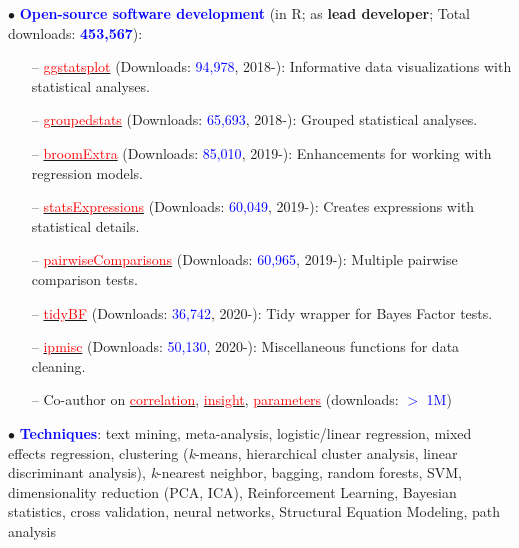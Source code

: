 \documentclass[10pt]{article}
\begin{document}
	$\bullet$ \textcolor{blue}{\textbf{Open-source software development}} (in R; as \textbf{lead developer}; Total downloads: \textcolor{blue}{\textbf{453,567}}):
	 \vspace*{-0.09in}
	 
	\begin{itemize}
	\itemsep-0.1em
	\item[--] \href{https://indrajeetpatil.github.io/ggstatsplot/}{\textcolor{red}{ggstatsplot}} (Downloads: \textcolor{blue}{94,978}, 2018-): Informative data visualizations with statistical analyses.
	\item[--] \href{https://indrajeetpatil.github.io/groupedstats/}{\textcolor{red}{groupedstats}} (Downloads: \textcolor{blue}{65,693}, 2018-): Grouped statistical analyses.
	\item[--] \href{https://indrajeetpatil.github.io/groupedstats/}{\textcolor{red}{broomExtra}} (Downloads: \textcolor{blue}{85,010}, 2019-): Enhancements for working with regression models.
	\item[--] \href{https://indrajeetpatil.github.io/statsExpressions/}{\textcolor{red}{statsExpressions}} (Downloads: \textcolor{blue}{60,049}, 2019-): Creates expressions with statistical details.
	\item[--] \href{https://indrajeetpatil.github.io/pairwiseComparisons/}{\textcolor{red}{pairwiseComparisons}} (Downloads: \textcolor{blue}{60,965}, 2019-): Multiple pairwise comparison tests.
    \item[--] \href{https://indrajeetpatil.github.io/tidyBF/}{\textcolor{red}{tidyBF}} (Downloads: \textcolor{blue}{36,742}, 2020-): Tidy wrapper for Bayes Factor tests.
	\item[--] \href{https://indrajeetpatil.github.io/ipmisc/}{\textcolor{red}{ipmisc}} (Downloads: \textcolor{blue}{50,130}, 2020-): Miscellaneous functions for data cleaning.	
	\item[--] Co-author on \href{https://easystats.github.io/correlation/}{\textcolor{red}{correlation}}, \href{https://easystats.github.io/insight/}{\textcolor{red}{insight}}, \href{https://easystats.github.io/parameters/}{\textcolor{red}{parameters}} (downloads: \textcolor{blue}{$>$ 1M})
	\end{itemize}	

	$\bullet$ \textcolor{blue}{\textbf{Techniques}}: text mining, meta-analysis, logistic/linear regression, mixed effects regression, clustering \hspace*{0.1in}(\textit{k}-means, hierarchical cluster analysis, linear discriminant analysis), \textit{k}-nearest neighbor, bagging, random \hspace*{0.1in}forests, SVM, dimensionality reduction (PCA, ICA), Reinforcement Learning, Bayesian statistics, cross \hspace*{0.1in}validation, neural networks, Structural Equation Modeling, path analysis
	\miniskip
	
\end{document}
